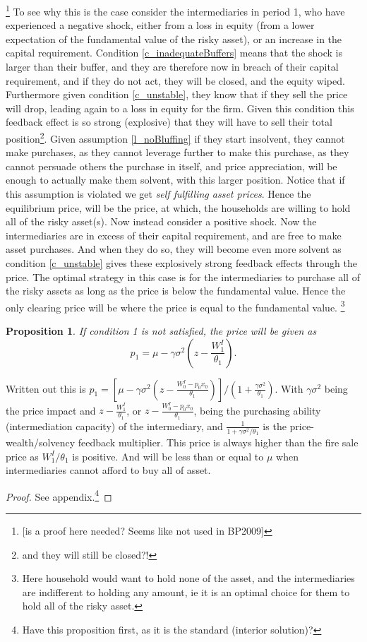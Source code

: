 \documentclass[11pt]{article}
\newtheorem{proposition}{Proposition}
\begin{document}
\footnote{[is a proof here needed? Seems like not used in BP2009]} To see why this is the case consider the intermediaries in period 1, who have experienced a negative shock, either from a loss in equity (from a lower expectation of the fundamental value of the risky asset), or an increase in the capital requirement. Condition \ref{c_inadequateBuffers} means that the shock is larger than their buffer, and they are therefore now in breach of their capital requirement, and if they do not act, they will be closed, and the equity wiped. Furthermore given condition \ref{c_unstable}, they know that if they sell the price will drop, leading again to a loss in equity for the firm. Given this condition this feedback effect is so strong (explosive) that they will have to sell their total position\footnote{and they will still be closed?!}. Given assumption \ref{l_noBluffing} if they start insolvent, they cannot make purchases, as they cannot leverage further to make this purchase, as they cannot persuade others the purchase in itself, and price appreciation, will be enough to actually make them solvent, with this larger position. Notice that if this assumption is violated we get \textit{self fulfilling asset prices}. Hence the equilibrium price, will be the price, at which, the households are willing to hold all of the risky asset(s). Now instead consider a positive shock. Now the intermediaries are in excess of their capital requirement, and are free to make asset purchases. And when they do so, they will become even more solvent as condition \ref{c_unstable} gives these explosively strong feedback effects through the price. The optimal strategy in this case is for the intermediaries to purchase all of the risky assets as long as the price is below the fundamental value. Hence the only clearing price will be where the price is equal to the fundamental value. \footnote{Here household would want to hold none of the asset, and the intermediaries are indifferent to holding any amount, ie it is an optimal choice for them to hold all of the risky asset.}

\begin{proposition} \label{p_pricewoExplosive}
If condition 1 is not satisfied, the price will be given as 
\begin{equation}
p_1 = \mu - \gamma\sigma^2 \left(z-\frac{W^I_1}{\theta_1}\right).
\end{equation}
\end{proposition}
Written out this is $p_1 = \left[\mu - \gamma\sigma^2 \left(z - \frac{W_0^I - p_0 x_0}{\theta_1}\right)\right]/(1+\frac{\gamma\sigma^2}{\theta_1}) $. With $\gamma\sigma^2$ being the price impact and $z-\frac{W^I_1}{\theta_1}$, or $z - \frac{W_0^I - p_0 x_0}{\theta_1}$, being the purchasing ability (intermediation capacity) of the intermediary, and $\frac{1}{1 + \gamma\sigma^2/\theta_1}$ is the price-wealth/solvency feedback multiplier. This price is always higher than the fire sale price as $W^I_1/\theta_1$ is positive. And will be less than or equal to $\mu$ when intermediaries cannot afford to buy all of asset.
\begin{proof}
See appendix.\footnote{Have this proposition first, as it is the standard (interior solution)?}
\end{proof}
\end{document}
